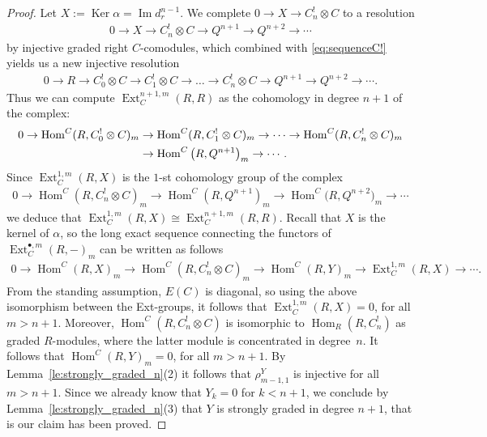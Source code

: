 \documentclass[pdftex]{sigma}
\DeclareMathOperator{\Ker}{Ker}
\DeclareMathOperator{\im}{Im}
\newcommand\ot{\otimes}
\renewcommand{\^}[1]{\mbox{$^{\left( #1 \right)}$}}
\renewcommand{\_}[1]{\mbox{$_{\left( #1 \right)}$}}
\newcommand{\Ext}{\operatorname{Ext}}
\newcommand{\al}{\alpha}
\numberwithin{equation}{section}
\begin{document}
\begin{proof}
Let $X:=\Ker \al=\im d^{n-1}_r$. We complete $0 \rightarrow {X} \rightarrow C_n^! \otimes C$ to a resolution
\begin{gather*}
 0 \rightarrow X\rightarrow C_n^!\ot C \rightarrow Q^{n+1} \rightarrow Q^{n+2} \rightarrow \cdots
\end{gather*}
by injective graded right $C$-comodules, which combined with \eqref{eq:sequenceC!} yields us a new injective resolution
\begin{gather*} %
0 \rightarrow R \rightarrow C_0^!\ot C \rightarrow C_1^!\ot C\rightarrow \dots \rightarrow C_n^! \otimes C \rightarrow Q^{n+1} \rightarrow Q^{n+2} \rightarrow \cdots.
\end{gather*}
Thus we can compute $\operatorname{Ext}_C^{n+1,m}(R,R)$ as the cohomology in degree $n+1$ of the complex:
\begin{gather*}
 0 \rightarrow \operatorname{Hom}^C(R,C_0^!\ot C)_m \rightarrow \operatorname{Hom}^C(R,C_1^!\ot C)_m \rightarrow \dots \rightarrow \operatorname{Hom}^C(R, C_n^!\ot C)_m\\
 \hphantom{0}{} \rightarrow \operatorname{Hom}^C\big(R,Q^{n+1}\big)_m \rightarrow \cdots.
\end{gather*}
Since $\operatorname{Ext}^{1,m}_C(R,X)$ is the $1$-st cohomology group of the complex
\begin{gather*}
 0 \rightarrow \operatorname{Hom}^C(R,C_n^! \otimes C)_m \rightarrow \operatorname{Hom}^C(R,Q^{n+1})_m \rightarrow \operatorname{Hom}^C\big(R,Q^{n+2}\big)_m \rightarrow \cdots
\end{gather*}
we deduce that $\operatorname{Ext}^{1,m}_C(R,X)\cong\operatorname{Ext}_C^{n+1,m}(R,R)$. Recall that $X$ is the kernel of $\al$, so the long exact sequence connecting the functors of $\Ext^{\bullet,m}_C(R,-)_m$ can be written as follows
\begin{gather*}
 0 \rightarrow \operatorname{Hom}^C(R,X)_m \rightarrow \operatorname{Hom}^C(R, C_n^! \otimes C)_m \rightarrow \operatorname{Hom}^C(R,Y)_m \rightarrow \operatorname{Ext}^{1,m}_C(R,X) \rightarrow \cdots.
\end{gather*}
From the standing assumption, $E(C)$ is diagonal, so using the above isomorphism between the Ext-groups, it follows that $\operatorname{Ext}_C^{1,m}(R,X)=0$, for all $m>n+1$. Moreover, $\operatorname{Hom}^C(R,C_n^! \otimes C)$ is isomorphic to $\operatorname{Hom}_R(R,C_n^! )$ as graded $R$-modules, where the latter module is concentrated in degree~$n$. It follows that $\operatorname{Hom}^C(R,Y)_m=0$, for all $m > n+1$. By Lemma~\ref{le:strongly_graded_n}(2) it follows that $\rho^Y_{m-1,1}$ is injective for all $m>n+1$. Since we already know that $Y_k=0$ for $k<n+1$, we conclude by Lemma~\ref{le:strongly_graded_n}(3) that $Y$ is strongly graded in degree $n+1$, that is our claim has been proved.


\end{proof}
\end{document}
